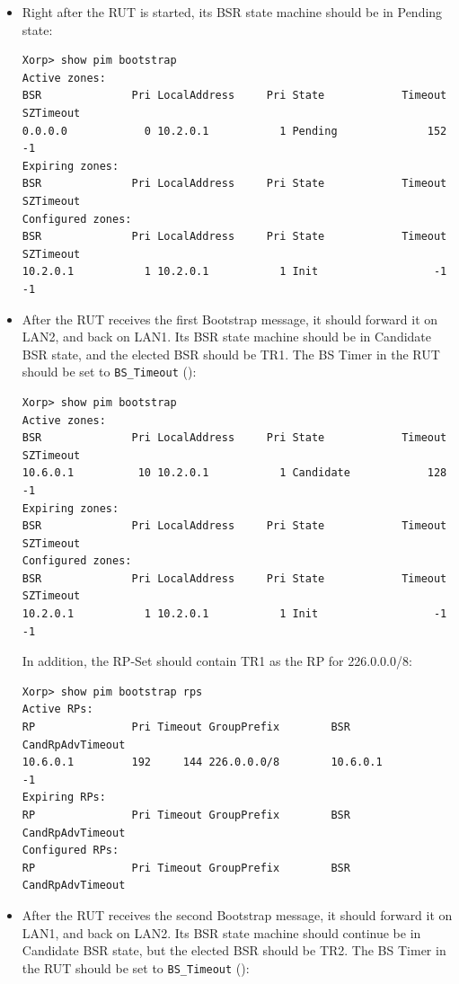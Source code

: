 \documentclass[11pt]{report}
\begin{document}
\begin{itemize}

  \item Right after the RUT is started, its BSR state machine should be in
  Pending state:

\begin{verbatim}
Xorp> show pim bootstrap 
Active zones:
BSR              Pri LocalAddress     Pri State            Timeout SZTimeout
0.0.0.0            0 10.2.0.1           1 Pending              152        -1
Expiring zones:
BSR              Pri LocalAddress     Pri State            Timeout SZTimeout
Configured zones:
BSR              Pri LocalAddress     Pri State            Timeout SZTimeout
10.2.0.1           1 10.2.0.1           1 Init                  -1        -1
\end{verbatim}

  \item After the RUT receives the first Bootstrap message, it should forward
        it on LAN2, and back on LAN1. Its BSR state machine
        should be in Candidate BSR state, and the elected BSR should be TR1.
        The BS Timer in the RUT should be set to \verb=BS_Timeout=
        ({\PimsmBSTimeout}):

\begin{verbatim}
Xorp> show pim bootstrap 
Active zones:
BSR              Pri LocalAddress     Pri State            Timeout SZTimeout
10.6.0.1          10 10.2.0.1           1 Candidate            128        -1
Expiring zones:
BSR              Pri LocalAddress     Pri State            Timeout SZTimeout
Configured zones:
BSR              Pri LocalAddress     Pri State            Timeout SZTimeout
10.2.0.1           1 10.2.0.1           1 Init                  -1        -1
\end{verbatim}

  In addition, the RP-Set should contain TR1 as the RP for 226.0.0.0/8:

\begin{verbatim}
Xorp> show pim bootstrap rps 
Active RPs:
RP               Pri Timeout GroupPrefix        BSR         CandRpAdvTimeout
10.6.0.1         192     144 226.0.0.0/8        10.6.0.1                  -1
Expiring RPs:
RP               Pri Timeout GroupPrefix        BSR         CandRpAdvTimeout
Configured RPs:
RP               Pri Timeout GroupPrefix        BSR         CandRpAdvTimeout
\end{verbatim}

  \item After the RUT receives the second Bootstrap message, it should forward
        it on LAN1, and back on LAN2. Its BSR state machine
        should continue be in Candidate BSR state, but the elected BSR should
        be TR2.
        The BS Timer in the RUT should be set to \verb=BS_Timeout=
        ({\PimsmBSTimeout}):


\end{itemize}
\end{document}
